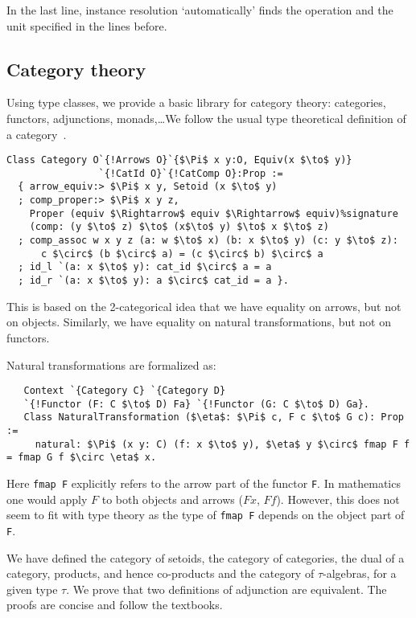 \documentclass[a4paper,10pt,runningheads]{llncs}
\begin{document}
In the last line, instance resolution `automatically' finds the operation and the unit specified in
the lines before.

\subsection{Category theory}\label{cats}
Using type classes, we provide a basic library for category theory: categories, functors,
adjunctions, monads,\ldots We follow the usual type theoretical definition of a
category~\cite{saibi1995constructive}.


\begin{lstlisting}
Class Category O`{!Arrows O}`{$\Pi$ x y:O, Equiv(x $\to$ y)}
                `{!CatId O}`{!CatComp O}:Prop :=
  { arrow_equiv:> $\Pi$ x y, Setoid (x $\to$ y)
  ; comp_proper:> $\Pi$ x y z,
    Proper (equiv $\Rightarrow$ equiv $\Rightarrow$ equiv)%signature
    (comp: (y $\to$ z) $\to$ (x$\to$ y) $\to$ x $\to$ z)
  ; comp_assoc w x y z (a: w $\to$ x) (b: x $\to$ y) (c: y $\to$ z):
      c $\circ$ (b $\circ$ a) = (c $\circ$ b) $\circ$ a
  ; id_l `(a: x $\to$ y): cat_id $\circ$ a = a
  ; id_r `(a: x $\to$ y): a $\circ$ cat_id = a }.
\end{lstlisting}

This is based on the 2-categorical idea that we have equality on arrows, but not on objects.
Similarly, we have equality on natural transformations, but not on functors.

Natural transformations are formalized as:
\begin{lstlisting}
   Context `{Category C} `{Category D}
   `{!Functor (F: C $\to$ D) Fa} `{!Functor (G: C $\to$ D) Ga}.
   Class NaturalTransformation ($\eta$: $\Pi$ c, F c $\to$ G c): Prop :=
     natural: $\Pi$ (x y: C) (f: x $\to$ y), $\eta$ y $\circ$ fmap F f = fmap G f $\circ \eta$ x.
\end{lstlisting}

Here \lstinline|fmap F| explicitly refers to the arrow part of the functor \lstinline|F|.
In mathematics one would apply $F$ to both objects and arrows ($F x$, $F f$). However, this does
not seem to fit with type theory as the type of \lstinline|fmap F| depends on the object part of
\lstinline|F|.

We have defined the category of setoids, the category of categories, the dual of a category,
products, and hence co-products and the category of $\tau$-algebras, for a given type $\tau$.
We prove that two definitions of adjunction are equivalent. The proofs are concise and follow the
textbooks.
\end{document}
